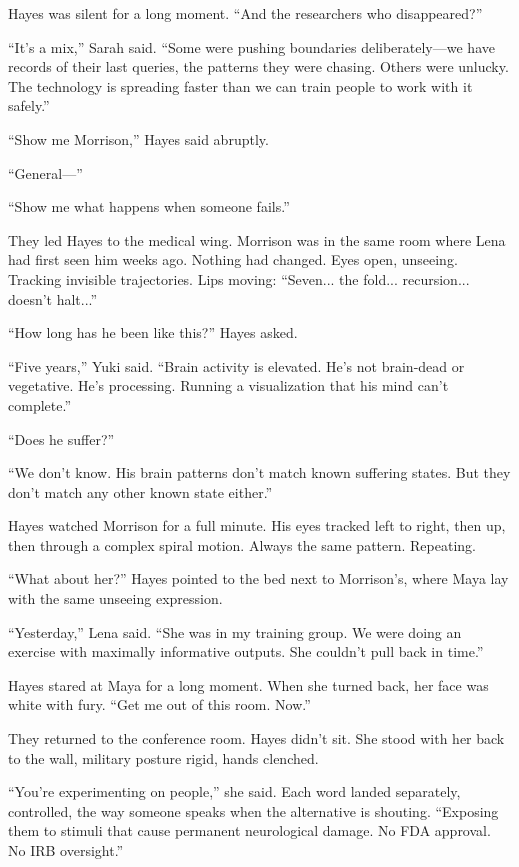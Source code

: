 Hayes was silent for a long moment. ``And the researchers who disappeared?''

``It's a mix,'' Sarah said. ``Some were pushing boundaries deliberately—we have records of their last queries, the patterns they were chasing. Others were unlucky. The technology is spreading faster than we can train people to work with it safely.''

``Show me Morrison,'' Hayes said abruptly.

``General---''

``Show me what happens when someone fails.''

They led Hayes to the medical wing. Morrison was in the same room where Lena had first seen him weeks ago. Nothing had changed. Eyes open, unseeing. Tracking invisible trajectories. Lips moving: ``Seven... the fold... recursion... doesn't halt...''

``How long has he been like this?'' Hayes asked.

``Five years,'' Yuki said. ``Brain activity is elevated. He's not brain-dead or vegetative. He's processing. Running a visualization that his mind can't complete.''

``Does he suffer?''

``We don't know. His brain patterns don't match known suffering states. But they don't match any other known state either.''

Hayes watched Morrison for a full minute. His eyes tracked left to right, then up, then through a complex spiral motion. Always the same pattern. Repeating.

``What about her?'' Hayes pointed to the bed next to Morrison's, where Maya lay with the same unseeing expression.

``Yesterday,'' Lena said. ``She was in my training group. We were doing an exercise with maximally informative outputs. She couldn't pull back in time.''

Hayes stared at Maya for a long moment. When she turned back, her face was white with fury. ``Get me out of this room. Now.''

They returned to the conference room. Hayes didn't sit. She stood with her back to the wall, military posture rigid, hands clenched.

``You're experimenting on people,'' she said. Each word landed separately, controlled, the way someone speaks when the alternative is shouting. ``Exposing them to stimuli that cause permanent neurological damage. No FDA approval. No IRB oversight.''

